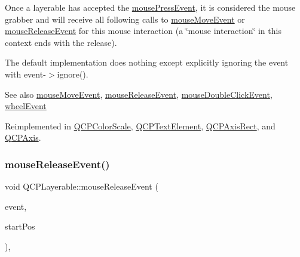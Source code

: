 Once a layerable has accepted the \hyperlink{classQCPLayerable_af6567604818db90f4fd52822f8bc8376}{mouse\+Press\+Event}, it is considered the mouse grabber and will receive all following calls to \hyperlink{classQCPLayerable_a9eee1ba47fd69be111059ca3881933e4}{mouse\+Move\+Event} or \hyperlink{classQCPLayerable_aa0d79b005686f668622bbe66ac03ba2c}{mouse\+Release\+Event} for this mouse interaction (a \char`\"{}mouse interaction\char`\"{} in this context ends with the release).

The default implementation does nothing except explicitly ignoring the event with {\ttfamily event-\/$>$ignore()}.

\begin{DoxySeeAlso}{See also}
\hyperlink{classQCPLayerable_a9eee1ba47fd69be111059ca3881933e4}{mouse\+Move\+Event}, \hyperlink{classQCPLayerable_aa0d79b005686f668622bbe66ac03ba2c}{mouse\+Release\+Event}, \hyperlink{classQCPLayerable_a4171e2e823aca242dd0279f00ed2de81}{mouse\+Double\+Click\+Event}, \hyperlink{classQCPLayerable_a47dfd7b8fd99c08ca54e09c362b6f022}{wheel\+Event} 
\end{DoxySeeAlso}


Reimplemented in \hyperlink{classQCPColorScale_a91f633b97ffcd57fdf8cd814974c20e6}{Q\+C\+P\+Color\+Scale}, \hyperlink{classQCPTextElement_ad7b2c98355e3d2f912574b74fcee0574}{Q\+C\+P\+Text\+Element}, \hyperlink{classQCPAxisRect_aa9a7c807eaa4666870ac94aa6abc4dde}{Q\+C\+P\+Axis\+Rect}, and \hyperlink{classQCPAxis_a61bc07cda6193a3fa6b5aa198fc4e4fa}{Q\+C\+P\+Axis}.

\mbox{\label{classQCPLayerable_aa0d79b005686f668622bbe66ac03ba2c}} 
\subsubsection{\texorpdfstring{mouse\+Release\+Event()}{mouseReleaseEvent()}}
{\footnotesize\ttfamily void Q\+C\+P\+Layerable\+::mouse\+Release\+Event (\begin{DoxyParamCaption}\item[{Q\+Mouse\+Event $\ast$}]{event,  }\item[{const Q\+PointF \&}]{start\+Pos }\end{DoxyParamCaption})\hspace{0.3cm}{\ttfamily [protected]}, {\ttfamily [virtual]}}

